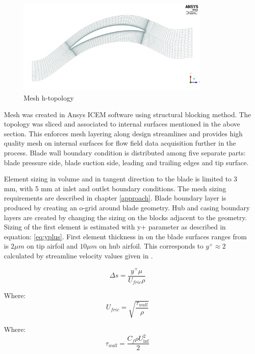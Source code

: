\begin{figure}[h!]
\centering %
\includegraphics[width=0.85\textwidth]{Pictures/r67_htopo.jpg}
\caption{Mesh h-topology}
\label{h_topo}
\end{figure}

Mesh was created in Ansys ICEM software using structural blocking method. The topology was sliced and associated to internal surfaces mentioned in the above section. This enforces mesh layering along design streamlines and provides high quality mesh on internal surfaces for flow field data acquisition further in the process. Blade wall boundary condition is distributed among five separate parts: blade pressure side, blade suction side, leading and trailing edges and tip surface. 

Element sizing in volume and in tangent direction to the blade is limited to 3 mm, with 5 mm at inlet and outlet boundary conditions. The mesh sizing requirements are described in chapter \ref{approach}.  Blade boundary layer is produced by creating an o-grid around blade geometry. Hub and casing boundary layers are created by changing the sizing on the blocks adjacent to the geometry. Sizing of the first element is estimated with y+ parameter as described in equation: \ref{eq:yplus}. First element thickness in on the blade surfaces ranges from is $2 \mu m$ on tip airfoil and $10 \mu m$ on hub airfoil. This corresponds to $y^{+} \approx 2$ calculated by streamline velocity values given in \citep{r67laser}.

\begin{equation} \label{eq:yplus}
\Delta s = \frac{y^{+} \mu}{U_{fric} \rho}
\end{equation}

Where:
\begin{equation}
U_{fric} = \sqrt{\frac{\tau_{wall}}{\rho}}
\end{equation}

Where:
\begin{equation}
\tau_{wall} = \frac{C_f \rho U_{\inf}^{2}}{2}
\end{equation}

